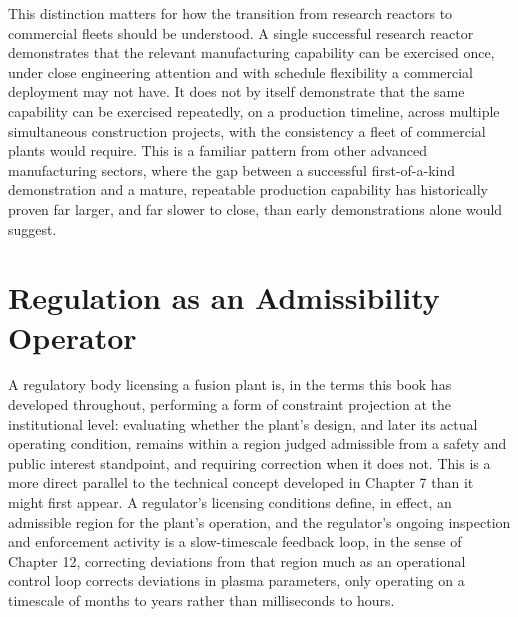 This distinction matters for how the transition from research reactors to commercial fleets should be understood. A single successful research reactor demonstrates that the relevant manufacturing capability can be exercised once, under close engineering attention and with schedule flexibility a commercial deployment may not have. It does not by itself demonstrate that the same capability can be exercised repeatedly, on a production timeline, across multiple simultaneous construction projects, with the consistency a fleet of commercial plants would require. This is a familiar pattern from other advanced manufacturing sectors, where the gap between a successful first-of-a-kind demonstration and a mature, repeatable production capability has historically proven far larger, and far slower to close, than early demonstrations alone would suggest.

\section{Regulation as an Admissibility Operator}

A regulatory body licensing a fusion plant is, in the terms this book has developed throughout, performing a form of constraint projection at the institutional level: evaluating whether the plant's design, and later its actual operating condition, remains within a region judged admissible from a safety and public interest standpoint, and requiring correction when it does not. This is a more direct parallel to the technical concept developed in Chapter 7 than it might first appear. A regulator's licensing conditions define, in effect, an admissible region for the plant's operation, and the regulator's ongoing inspection and enforcement activity is a slow-timescale feedback loop, in the sense of Chapter 12, correcting deviations from that region much as an operational control loop corrects deviations in plasma parameters, only operating on a timescale of months to years rather than milliseconds to hours.

